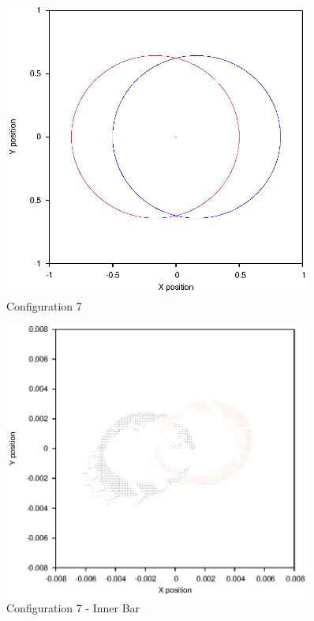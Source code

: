 \documentclass[a4paper,12pt]{article}
\begin{document}
\begin{figure}[H]
\centering
\includegraphics[width=0.9\textwidth]{./results/005-58-005-3/Orbit.eps}
\caption{Configuration 7}
\label{fig:config7}
\end{figure}
\begin{figure}[H]
\centering
\includegraphics[width=0.9\textwidth]{./results/005-58-005-3/Inner.eps}
\caption{Configuration 7 - Inner Bar}
\label{fig:config7i}
\end{figure}
\end{document}
